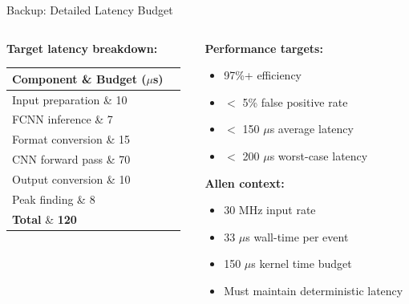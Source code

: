 \documentclass[10pt,aspectratio=169]{beamer}
\begin{document}
\begin{frame}{Backup: Detailed Latency Budget}
  \begin{columns}[T]
    \begin{column}{0.5\textwidth}
      \textbf{Target latency breakdown:}
      \begin{center}
        \begin{tabular}{lr}
          \toprule
          \textbf{Component} \& \textbf{Budget ($\mu$s)} \\
          \midrule
          Input preparation \& 10 \\
          FCNN inference \& 7 \\
          Format conversion \& 15 \\
          CNN forward pass \& 70 \\
          Output conversion \& 10 \\
          Peak finding \& 8 \\
          \midrule
          \textbf{Total} \& \textbf{120} \\
          \bottomrule
        \end{tabular}
      \end{center}
    \end{column}

    \begin{column}{0.5\textwidth}
      \textbf{Performance targets:}
      \begin{itemize}
        \item 97\%+ efficiency
        \item $<$ 5\% false positive rate
        \item $<$ 150 $\mu$s average latency
        \item $<$ 200 $\mu$s worst-case latency
      \end{itemize}

      \vspace{0.5cm}
      \textbf{Allen context:}
      \begin{itemize}
        \item 30 MHz input rate
        \item 33 $\mu$s wall-time per event
        \item 150 $\mu$s kernel time budget
        \item Must maintain deterministic latency
      \end{itemize}
    \end{column}
  \end{columns}
\end{frame}
\end{document}
